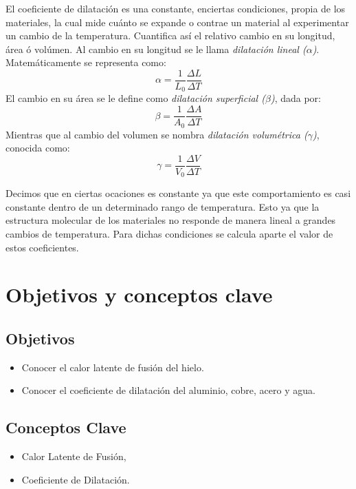 \documentclass{article}
\begin{document}
        El coeficiente de dilatación es una constante, enciertas condiciones, propia de los materiales, la cual mide cuánto se expande o contrae un material al experimentar un cambio de la temperatura. Cuantifica así el relativo cambio en su longitud, área ó volúmen. Al cambio en su longitud se le llama \textit{dilatación lineal ($\alpha$)}. Matemáticamente se representa como: 
        \begin{equation}
            \alpha = \frac{1}{L_{0}}\frac{\Delta L}{ \Delta T}
        \end{equation}
        El cambio en su área se le define como \textit{dilatación superficial ($\beta$)}, dada por:
        \begin{equation}
            \beta = \frac{1}{A_{0}}\frac{\Delta A}{ \Delta T}
        \end{equation}
        Mientras que al cambio del volumen se nombra \textit{dilatación volumétrica ($\gamma$)}, conocida como:
        \begin{equation}
            \gamma = \frac{1}{V_{0}}\frac{\Delta V}{ \Delta T}
        \end{equation} 

        Decimos que en ciertas ocaciones es constante ya que este comportamiento es casi constante dentro de un determinado rango de temperatura. Esto ya que la estructura molecular de los materiales no responde de manera lineal a grandes cambios de temperatura. Para dichas condiciones se calcula aparte el valor de estos coeficientes. \cite{CoeficientesDilatación}

\section{Objetivos y conceptos clave}
\subsection{Objetivos}
        \begin{itemize}
            \item Conocer el calor latente de fusión del hielo.
            \item Conocer el coeficiente de dilatación del aluminio, cobre, acero y agua.
        \end{itemize}

    \subsection{Conceptos Clave}
        \begin{itemize}
            \item Calor Latente de Fusión,
            \item Coeficiente de Dilatación.
        \end{itemize}
\end{document}
